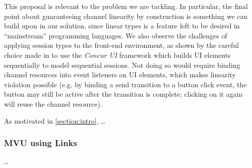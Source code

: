 This proposal is relevant to the problem we are tackling.
In particular, the final point about guaranteeing channel linearity
by construction is something we can build upon in our solution,
since linear types is a feature left to be desired in
``mainstream'' programming languages.
We also observe the challenges of applying session types 
to the front-end environment, as shown by the careful choice 
made in \cite{PureScript2019} 
to use the \textit{Concur UI} framework which 
builds UI elements sequentially to model sequential sessions.
Not doing so would require binding channel resources into 
event listeners on UI elements, which makes linearity violation possible 
(e.g. by binding a send transition to a button click event,
the button may still be active after the transition is complete;
clicking on it again will reuse the channel resource).

As motivated in \cref{section:intro}, \dots


\subsubsection{MVU using Links}
\dots